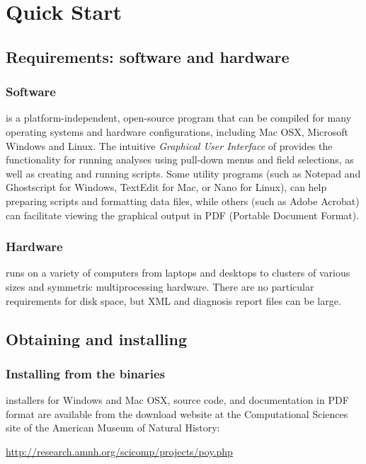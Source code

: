 \chapter{\poy Quick Start}

\section{Requirements: software and hardware}

\subsection{Software}
\poy is a platform-independent, open-source program that can be compiled for many operating systems 
and hardware configurations, including Mac OSX, Microsoft Windows and Linux. %
The intuitive \emph{Graphical User Interface} of \poy provides the functionality for running analyses using pull-down 
menus and field selections, as well as creating and running \poy scripts. Some utility programs (such as Notepad 
and Ghostscript for Windows, TextEdit for Mac, or Nano for Linux), can help preparing \poy scripts and formatting 
data files, while others (such as Adobe Acrobat) can facilitate viewing the graphical output in PDF (Portable Document Format).

\subsection{Hardware}
\poy runs on a variety of computers from laptops and desktops to clusters 
of various sizes and symmetric multiprocessing hardware. There are no
particular requirements for disk space, but XML and diagnosis report files can be large.

\section{Obtaining and installing \poy}
\subsection{Installing from the binaries}
\poy installers for Windows and Mac OSX, source code, and documentation in PDF format are available from 
the \poy download website at the Computational Sciences site of the American Museum of Natural History:

\begin{center}
\url{http://research.amnh.org/scicomp/projects/poy.php}
\end{center}

